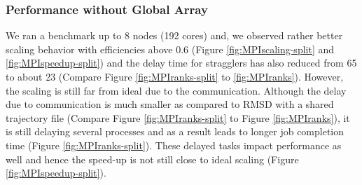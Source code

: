 \subsubsection*{Performance without Global Array}
We ran a benchmark up to 8 nodes (192 cores) and, we observed rather better scaling behavior with efficiencies above 0.6 (Figure \ref{fig:MPIscaling-split} and \ref{fig:MPIspeedup-split}) and the delay time for stragglers has also reduced from 65 to about 23 (Compare Figure \ref{fig:MPIranks-split} to  \ref{fig:MPIranks}). 
However, the scaling is still far from ideal due to the communication. 
Although the delay due to communication is much smaller as compared to RMSD with a shared trajectory file (Compare Figure \ref{fig:MPIranks-split} to Figure \ref{fig:MPIranks}), it is still delaying several processes and as a result leads to longer job completion time (Figure \ref{fig:MPIranks-split}). 
These delayed tasks impact performance as well and hence the speed-up is not still close to ideal scaling (Figure \ref{fig:MPIspeedup-split}).

